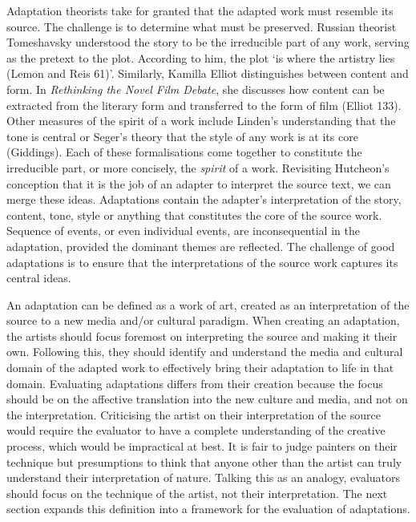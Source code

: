 \documentclass[12pt]{article}
\begin{document}
Adaptation theorists take for granted that the adapted work must resemble its
source. The challenge is to determine what must be preserved. Russian theorist 
Tomeshavsky understood the story to be the irreducible part of any work,
serving as the pretext to the plot. According to him, the plot `is where the 
artistry lies (Lemon and Reis 61)'. Similarly, Kamilla Elliot distinguishes between content and
form. In \textit{Rethinking the Novel Film Debate}, she discusses how 
content can be extracted from the literary form and transferred to the 
form of film (Elliot 133). Other measures of the spirit of a work include 
Linden's understanding that the tone is central or Seger's theory that
the style of any work is at its core (Giddings).
Each of these formalisations come together to constitute the irreducible part,
or more concisely, the \textit{spirit} of a work. Revisiting Hutcheon's
conception that it is the job of an adapter to interpret the source text, we can merge
these ideas. Adaptations contain the adapter's interpretation of the story, 
content, tone, style or anything that constitutes the core of the source work. 
Sequence of events, or even individual events, are inconsequential in the
adaptation, provided the dominant themes are reflected. The
challenge of good adaptations is to ensure that the interpretations of the
source work captures its central ideas. 

An adaptation can be defined as a 
work of art, created as an interpretation of the source to a new media and/or 
cultural paradigm. When creating an adaptation, the artists should focus foremost
on interpreting the source and making it their own. Following this, they
should identify and understand the media and cultural domain of
the adapted work to effectively bring their adaptation to life in that domain.
Evaluating adaptations differs from their creation because the focus should 
be on the affective translation into the new culture and media, and not on the
interpretation. Criticising the artist on their interpretation of the source
would require the evaluator to have a complete understanding of the creative 
process, which would be impractical at best. It is fair to judge painters on
their technique but presumptions to think that anyone other than the artist can
truly understand their interpretation of nature. Talking this as an analogy,
evaluators should focus on the technique of the artist, not their
interpretation. The next section expands this definition into a framework
for the evaluation of adaptations.
\end{document}
